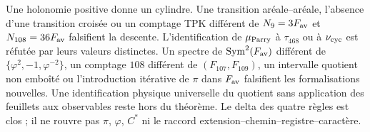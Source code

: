 Une holonomie positive donne un cylindre. Une transition aréale--aréale,
l'absence d'une transition croisée ou un comptage TPK différent de
\(N_9=3F_{\rm av}\) et \(N_{108}=36F_{\rm av}\) falsifient la descente.
L'identification de \(\mu_{\rm Parry}\) à \(\tau_{468}\) ou à
\(\nu_{\rm cyc}\) est réfutée par leurs valeurs distinctes. Un spectre de
\(\operatorname{Sym}^2(F_{\rm av})\) différent de
\(\{\varphi^2,-1,\varphi^{-2}\}\), un comptage \(108\) différent de
\((F_{107},F_{109})\), un intervalle quotient non emboîté ou l'introduction
itérative de \(\pi\) dans \(F_{\rm av}\) falsifient les formalisations
nouvelles. Une identification physique universelle du quotient sans application des
feuillets aux observables reste hors du théorème. Le delta des quatre règles
est clos ; il ne rouvre pas \(\pi\), \(\varphi\), \(C^*\) ni le raccord
extension--chemin--registre--caractère.
